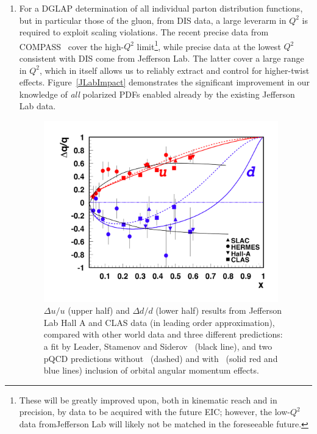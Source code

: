 \begin{enumerate}
\item For a DGLAP determination of all individual parton distribution functions, but in particular those of the gluon, from DIS data,
a large leverarm in $Q^2$ is required to exploit scaling violations. The recent precise data from COMPASS~\cite{COMPASS16}
cover the high-$Q^2$ limit\footnote{These will be greatly improved upon, both in kinematic reach and in precision, by data
to be acquired with the future EIC; however, the low-$Q^2$ data fromJefferson Lab will likely not be matched in the foreseeable future.},
 while precise data at the lowest $Q^2$ consistent with DIS come from Jefferson Lab. The latter cover 
a large range in $Q^2$, which in itself allows us to reliably extract and control for higher-twist effects. Figure~\ref{JLabImpact}
demonstrates the significant improvement in our knowledge of {\em all} polarized PDFs enabled already by the existing
Jefferson Lab data.

\begin{figure}[htb!]
\begin{center}
\includegraphics[width=4in]{dis/delqFig-eps-converted-to.pdf}
\end{center}
\vspace{-0.2in}
\caption{\baselineskip 13pt \small
$\Delta u/u$ (upper half) and $\Delta d/d$ (lower half) results from Jefferson Lab
Hall A and CLAS data (in leading order approximation), compared with other world data
and three different predictions: a fit by Leader, Stamenov and Siderov~\cite{Leader:2006xc} (black line), and two pQCD
predictions without~\cite{Brodsky:1994kg} (dashed)  and with~\cite{Avakian:2007xa} (solid red and blue lines)
inclusion of orbital angular momentum effects.  }
\label{highx}
\end{figure}


\end{enumerate}
